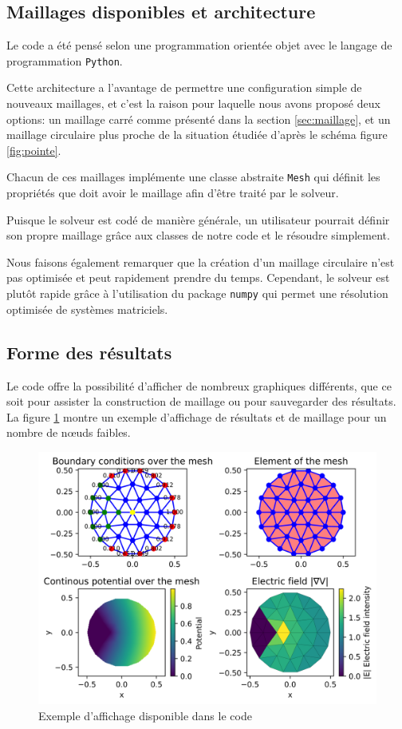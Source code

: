\documentclass{article}
\begin{document}
\newpage

\subsection{Maillages disponibles et architecture}

Le code a été pensé selon une programmation orientée objet
avec le langage de programmation \verb|Python|.

Cette architecture a l'avantage de permettre une configuration
simple de nouveaux maillages, et c'est la raison pour laquelle
nous avons proposé deux options: un maillage carré comme présenté
dans la section \ref{sec:maillage}, et un maillage circulaire
plus proche de la situation étudiée d'après le schéma
figure \ref{fig:pointe}.

Chacun de ces maillages implémente une classe abstraite
\verb|Mesh| qui définit les propriétés que doit avoir
le maillage afin d'être traité par le solveur.

Puisque le solveur est codé de manière générale, un utilisateur
pourrait définir son propre maillage grâce aux classes de notre
code et le résoudre simplement.

Nous faisons également remarquer que la création d'un maillage
circulaire n'est pas optimisée et peut rapidement prendre du temps.
Cependant, le solveur est plutôt rapide grâce à l'utilisation
du package \verb|numpy| qui permet une résolution optimisée
de systèmes matriciels.


\subsection{Forme des résultats}

Le code offre la possibilité d'afficher de nombreux graphiques
différents, que ce soit pour assister la construction de maillage
ou pour sauvegarder des résultats. La figure \ref{fig:plot_ex}
montre un exemple d'affichage de résultats et de maillage
pour un nombre de nœuds faibles.

\begin{figure}[!h]
    \centering
    \includegraphics[width=\textwidth]{img/plot_ex.png}
    \caption{Exemple d'affichage disponible dans le code}
    \label{fig:plot_ex}
\end{figure}
\end{document}
